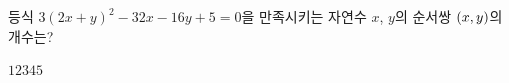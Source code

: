 등식 $3(2x+y)^2-32x-16y+5=0$을 만족시키는 자연수 $x$, $y$의 순서쌍 $(x{,}\mkern3mu y)$의 개수는?
\begin{choices32}{$1$}{$2$}{$3$}{$4$}{$5$}\end{choices32}
